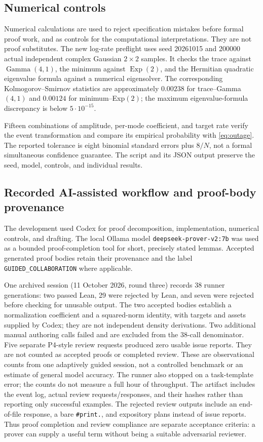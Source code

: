 \documentclass[11pt]{article}
\newcommand{\lean}[1]{{\small\nolinkurl{#1}}}
\begin{document}
\subsection{Numerical controls}
Numerical calculations are used to reject specification mistakes before
formal proof work, and as controls for the computational interpretations.
They are not proof substitutes. The new log-rate preflight uses seed
20261015 and 200000 actual independent complex Gaussian $2\times2$ samples.
It checks the trace against $\operatorname{Gamma}(4,1)$, the minimum against
$\operatorname{Exp}(2)$, and the Hermitian quadratic eigenvalue formula against
a numerical eigensolver. The corresponding Kolmogorov--Smirnov statistics are
approximately $0.00238$ for trace--Gamma$(4,1)$ and $0.00124$ for
minimum--Exp$(2)$; the maximum eigenvalue-formula discrepancy
is below $5\cdot10^{-15}$.

Fifteen combinations of amplitude, per-mode coefficient, and target rate
verify the event transformation and compare its empirical probability with
\eqref{eq:outage}. The reported tolerance is eight binomial standard errors
plus $8/N$, not a formal simultaneous confidence guarantee. The script and
its JSON output preserve the seed, model, controls, and individual results.

\subsection{Recorded AI-assisted workflow and proof-body provenance}
The development used Codex for proof decomposition, implementation, numerical
controls, and drafting. The local Ollama model
\lean{deepseek-prover-v2:7b} was used as a bounded proof-completion tool for
short, precisely stated lemmas. Accepted generated proof bodies retain their
provenance and the label \lean{GUIDED_COLLABORATION} where applicable.

One archived session (11 October 2026, round three) records 38 runner
generations: two passed Lean, 29 were rejected by Lean, and seven were rejected
before checking for unusable output. The two accepted bodies establish a
normalization coefficient and a squared-norm identity, with targets and assets
supplied by Codex; they are not independent density derivations. Two additional
manual authoring calls failed and are excluded from the 38-call denominator.
Five separate P4-style review requests produced zero usable issue reports.
They are not counted as accepted proofs or completed review. These are
observational counts from one adaptively guided session, not a controlled
benchmark or an estimate of general model accuracy. The runner also stopped
on a task-template error; the counts do not measure a full hour of throughput.
The artifact includes the event log, actual review requests/responses, and
their hashes rather than reporting only successful examples.
The rejected review outputs include an end-of-file response, a bare
\texttt{\#print.}, and expository plans instead of issue reports. Thus proof
completion and review compliance are separate acceptance criteria: a prover
can supply a useful term without being a suitable adversarial reviewer.
\end{document}
